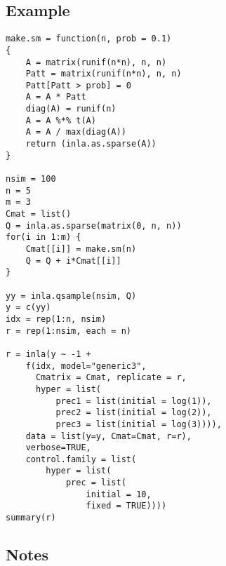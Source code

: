 \documentclass[a4paper,11pt]{article}
\begin{document}
\subsection*{Example}
{\small\begin{verbatim}
make.sm = function(n, prob = 0.1)
{
    A = matrix(runif(n*n), n, n)
    Patt = matrix(runif(n*n), n, n)
    Patt[Patt > prob] = 0
    A = A * Patt
    diag(A) = runif(n)
    A = A %*% t(A)
    A = A / max(diag(A))
    return (inla.as.sparse(A))
}
    
nsim = 100
n = 5
m = 3
Cmat = list()
Q = inla.as.sparse(matrix(0, n, n))
for(i in 1:m) {
    Cmat[[i]] = make.sm(n)
    Q = Q + i*Cmat[[i]]
}

yy = inla.qsample(nsim, Q)
y = c(yy)
idx = rep(1:n, nsim)
r = rep(1:nsim, each = n)

r = inla(y ~ -1 +
    f(idx, model="generic3",
      Cmatrix = Cmat, replicate = r, 
      hyper = list(
          prec1 = list(initial = log(1)), 
          prec2 = list(initial = log(2)),
          prec3 = list(initial = log(3)))), 
    data = list(y=y, Cmat=Cmat, r=r),
    verbose=TRUE, 
    control.family = list(
        hyper = list(
            prec = list(
                initial = 10,
                fixed = TRUE))))
summary(r)
\end{verbatim}}

\subsection*{Notes}
\end{document}
